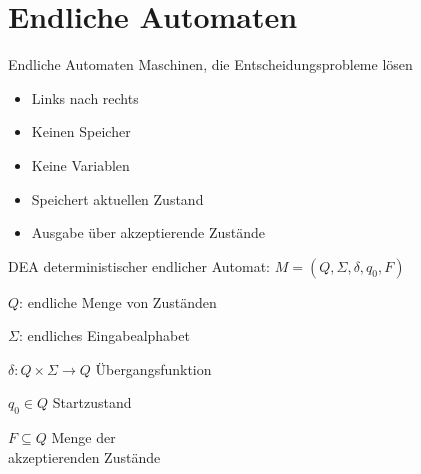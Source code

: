 \section*{Endliche Automaten}

\begin{definition}{Endliche Automaten}
    Maschinen, die Entscheidungsprobleme lösen\\
    \begin{minipage}{0.35\linewidth}
        \begin{itemize}
            \item Links nach rechts
            \item Keinen Speicher
            \item Keine Variablen
        \end{itemize}
    \end{minipage}
    \begin{minipage}{0.5\linewidth}
        \begin{itemize}
            \item Speichert aktuellen Zustand
            \item Ausgabe über akzeptierende Zustände
        \end{itemize}
    \end{minipage}
\end{definition}

\begin{definition}{DEA} deterministischer endlicher Automat: $M=(Q, \Sigma, \delta, q_{0}, F)$

    \begin{minipage}{0.5\linewidth}
        $Q$: endliche Menge von Zuständen

        $\Sigma$: endliches Eingabealphabet

        $\delta: Q \times \Sigma \rightarrow Q$ Übergangsfunktion
    \end{minipage}
    \hspace{1mm}
    \begin{minipage}{0.4\linewidth}
        $q_{0} \in Q$ Startzustand

        $F \subseteq Q$ Menge der\\ akzeptierenden Zustände
    \end{minipage}
\end{definition}

